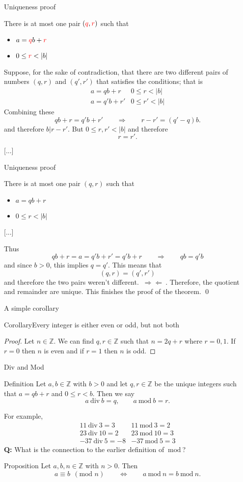 \documentclass{beamer}
\def\bl[#1]#2{\begin{block}{#1}#2\end{block}}
\def\itemb{\begin{itemize}}
\def\iteme{\end{itemize}}
\def\div{~\textrm{div}~}
\def\mod{~\textrm{mod}~}
\begin{document}
\begin{frame}{Uniqueness proof}
\bl[]{There is at most one pair $(\color{red}q\color{black},\color{red}r\color{black})$ such that
\itemb
\item $a=\color{red}q\color{black}b+\color{red}r\color{black}$
\item $0\leq \color{red}r\color{black}<|b|$
\iteme}

Suppose, for the sake of contradiction, that there are two different pairs of numbers $(q,r)$ and $(q',r')$ that satisfies the conditions; that is
\[
\begin{array}{cc}
a=qb+r&0\leq r< |b|\\
a=q'b+r'&0\leq r'<|b|
\end{array}
\]
Combining these
\[
qb+r=q'b+r'\qquad\Rightarrow\qquad  r-r'=(q'-q)b.
\]
and therefore $b|r-r'$. But $0\leq r,r'<|b|$ and therefore
\[
r=r'.
\]\vspace{-0.6cm}

[...]
\end{frame}
\begin{frame}{Uniqueness proof}
\bl[]{There is at most one pair $(q,r)$ such that
\itemb
\item $a=qb+r$
\item $0\leq r<|b|$
\iteme}
[...]

Thus
\[
qb+r=a=q'b+r'=q'b+r\qquad\Rightarrow\qquad qb=q'b
\]
and since $b>0$, this implies $q=q'$. This means that 
\[
(q,r)=(q',r')
\]
and therefore the two pairs weren't different. $~\Rightarrow\Leftarrow~$. Therefore, the quotient and remainder are unique. This finishes the proof of the theorem. \qed
\end{frame}

\begin{frame}{A simple corollary}
\bl[Corollary]{Every integer is either even or odd, but not both}
\begin{proof}
Let $n\in\mathbb{Z}$. We can find $q,r\in\mathbb{Z}$ such that $n=2q+r$ where $r=0,1$. If $r=0$ then $n$ is even and if $r=1$ then $n$ is odd.
\end{proof}
\end{frame}

\begin{frame}{Div and Mod}
\bl[Definition]{
Let $a,b\in\mathbb{Z}$ with $b>0$ and let $q,r\in\mathbb{Z}$ be the unique integers such that $a=qb+r$ and $0\leq r<b$. Then we say
\[
a~\textrm{div}~b=q,\qquad a~\textrm{mod}~ b=r.
\]}
For example,
\[
\begin{array}{cc}
11\div 3 =3&11\mod 3=2\\
23\div 10=2&23\mod 10=3\\
-37\div 5=-8&-37\mod 5=3
\end{array}
\]
\textbf{Q:} What is the connection to the earlier definition of $\mod$?
\bl[Proposition]{
Let $a,b,n\in\mathbb{Z}$ with $n>0$. Then
\[
a\equiv b~~ (\textrm{mod } n)\qquad\Leftrightarrow\qquad a\mod n=b\mod n.
\]
}
\end{frame}
\end{document}
